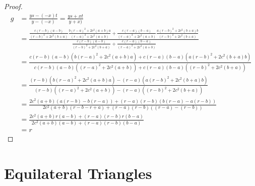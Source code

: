 \documentclass[a4paper,10pt]{article}
\begin{document}
\begin{proof}
\begin{align*}
g &= \frac{ys - (-x)t}{y - (-x)} = \frac{ys + xt}{y + x)}\\
   &= \frac{ \frac{c\left(r - b\right)\left(a - b\right)}{\left(r - b\right)^2 + 2c^2\left(b + a\right)} \frac{b\left(r - a\right)^2 + 2c^2\left(a + b\right)a}{\left(r - a\right)^2 + 2c^2\left(a + b\right)} + \frac{c\left(r - a\right)\left(b - a\right)}{\left(r - a\right)^2 + 2c^2\left(a + b\right)} \frac{a\left(r - b\right)^2 + 2c^2\left(b + a\right)b}{\left(r - b\right)^2 + 2c^2\left(b + a\right)} }{ \frac{c\left(r - b\right)\left(a - b\right)}{\left(r - b\right)^2 + 2c^2\left(b + a\right)} + \frac{c\left(r - a\right)\left(b - a\right)}{\left(r - a\right)^2 + 2c^2\left(a + b\right)} }\\
  &= \frac{c\left(r - b\right)\left(a - b\right) \left(b\left(r - a\right)^2 + 2c^2\left(a + b\right)a\right) + c\left(r - a\right)\left(b - a\right) \left(a\left(r - b\right)^2 + 2c^2\left(b + a\right)b\right) }{c\left(r - b\right)\left(a - b\right)\left(\left(r - a\right)^2 + 2c^2\left(a + b\right)\right) + c\left(r - a\right)\left(b - a\right)\left(\left(r - b\right)^2 + 2c^2\left(b + a\right)\right) }\\
  &= \frac{\left(r - b\right) \left(b\left(r - a\right)^2 + 2c^2\left(a + b\right)a\right) - \left(r - a\right) \left(a\left(r - b\right)^2 + 2c^2\left(b + a\right)b\right) }{\left(r - b\right)\left(\left(r - a\right)^2 + 2c^2\left(a + b\right)\right) - \left(r - a\right)\left(\left(r - b\right)^2 + 2c^2\left(b + a\right)\right) }\\
  &= \frac{2c^2\left(a + b\right)\left(a\left(r - b\right) - b\left(r - a\right)\right) + \left(r - a\right)\left(r - b\right)\left( b\left(r - a\right) - a\left(r - b\right)\right)}{2c^2\left(a + b\right)\left(r - b - r + a\right) + \left(r - a\right)\left(r - b\right)\left(\left(r - a\right) - \left(r - b\right)\right)}\\
  &= \frac{2c^2\left(a + b\right)r\left(a - b\right) + \left(r - a\right)\left(r - b\right)r\left(b - a\right)}{2c^2\left(a + b\right)\left(a - b\right) + \left(r - a\right)\left(r - b\right)\left(b - a\right)}\\
&= r
\end {align*}
\end{proof}

\section{Equilateral Triangles}
\end{document}
